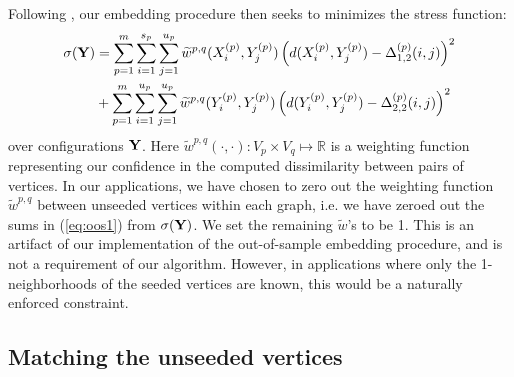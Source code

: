 \documentclass[12pt]{article}
\numberwithin{equation}{section}
\theoremstyle{definition}
\newcommand{\gD}{{\Delta}}
\begin{document}
Following \cite{oos}, our embedding procedure then seeks to minimizes the stress function:
\begin{align}
\label{eq:oos}
\sigma({\bf Y})&=\sum_{p=1}^{m}\sum_{i=1}^{s_p} \sum_{j=1}^{u_p}\widetilde w^{p,q}(X^{(p)}_i,Y^{(p)}_j)\left(d(X^{(p)}_i,Y^{(p)}_j)-\gD^{(p)}_{1,2}(i,j)\right)^2\\
\label{eq:oos1}
&+\sum_{p=1}^{m}\sum_{i=1}^{u_p}\sum_{j=1}^{u_p}\widetilde w^{p,q}(Y^{(p)}_i,Y^{(p)}_j)\left(d(Y^{(p)}_i,Y^{(p)}_j)-\gD^{(p)}_{2,2}(i,j)\right)^2
\end{align}
over configurations ${\bf Y}$. Here $\widetilde w^{p,q}(\cdot,\cdot):V_p\times V_q \mapsto\mathbb{R}$ is a weighting function representing our confidence in the computed dissimilarity between pairs of vertices.
In our applications, we have chosen to zero out the weighting function $\widetilde w^{p,q}$ between unseeded vertices within each graph, i.e. we have zeroed out the sums in (\ref{eq:oos1}) from $\sigma({\bf Y})$.  We set the remaining $\widetilde w$'s to be 1.  This is an artifact of our implementation of the out-of-sample embedding procedure, and is not a requirement of our algorithm.
However, in applications where only the 1-neighborhoods of the seeded vertices are known, this would be a naturally enforced constraint.

\subsection{Matching the unseeded vertices}
\label{S:nonseeds}
\end{document}
